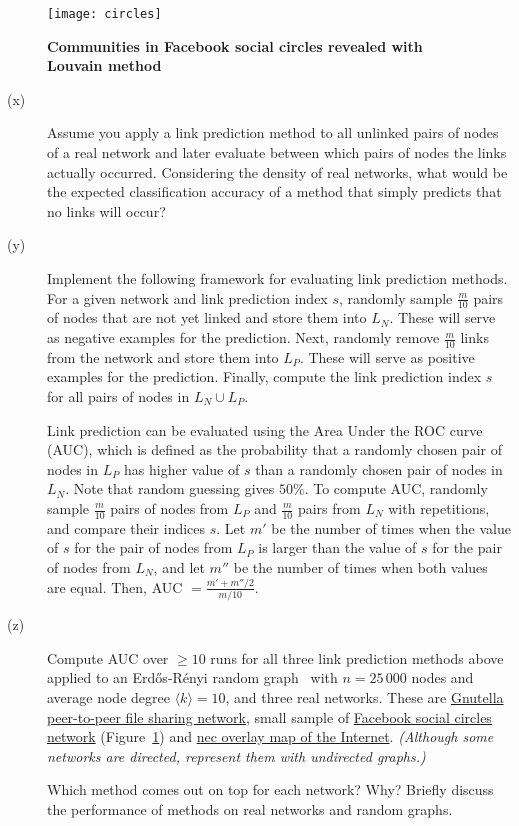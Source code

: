 \documentclass[11pt,a4paper]{article}
\newcommand{\avg}[1]{\langle#1\rangle}
\newcommand{\hint}[1]{{\it (#1)}}
\newcommand{\figref}[1]{{\color{LimeGreen}Figure~\ref{fig:#1}}}
\begin{document}
\begin{figure}[h] \centering
	\texttt{[image: circles]}
	\caption{{\bf Communities in Facebook social circles revealed with Louvain method}}
	\label{fig:circles}
\end{figure}

\begin{description}
	\item[(x)] Assume you apply a link prediction method to all unlinked pairs of nodes of a real network and later evaluate between which pairs of nodes the links actually occurred. Considering the density of real networks, what would be the expected classification accuracy of a method that simply predicts that no links will occur?
	\item[(y)] Implement the following framework for evaluating link prediction methods. For a given network and link prediction index $s$, randomly sample $\frac{m}{10}$ pairs of nodes that are not yet linked and store them into $L_N$. These will serve as negative examples for the prediction. Next, randomly remove $\frac{m}{10}$ links from the network and store them into $L_P$. These will serve as positive examples for the prediction. Finally, compute the link prediction index $s$ for all pairs of nodes in $L_N\cup L_P$. 
	
	Link prediction can be evaluated using the Area Under the ROC curve (AUC), which is defined as the probability that a randomly chosen pair of nodes in $L_P$ has higher value of $s$ than a randomly chosen pair of nodes in $L_N$. Note that random guessing gives $50\%$. To compute AUC, randomly sample $\frac{m}{10}$ pairs of nodes from $L_P$ and $\frac{m}{10}$ pairs from $L_N$ with repetitions, and compare their indices $s$. Let $m'$ be the number of times when the value of $s$ for the pair of nodes from $L_P$ is larger than the value of $s$ for the pair of nodes from $L_N$, and let $m''$ be the number of times when both values are equal. Then, AUC $=\frac{m'+m''/2}{m/10}$.
	\item[(z)] Compute AUC over $\geq 10$ runs for all three link prediction methods above applied to an Erd\H{o}s-R\'{e}nyi random graph~\cite{ER59} with $n=25\,000$ nodes and average node degree $\avg{k}=10$, and three real networks. These are \href{http://lovro.lpt.fri.uni-lj.si/ina/nets/gnutella}{Gnutella peer-to-peer file sharing network}, small sample of \href{http://lovro.lpt.fri.uni-lj.si/ina/nets/circles}{Facebook social circles network} (\figref{circles}) and \href{http://lovro.lpt.fri.uni-lj.si/ina/nets/nec}{nec overlay map of the Internet}. \hint{Although some networks are directed, represent them with undirected graphs.} 
	
	Which method comes out on top for each network? Why? Briefly discuss the performance of methods on real networks and random graphs.
\end{description}
\end{document}
